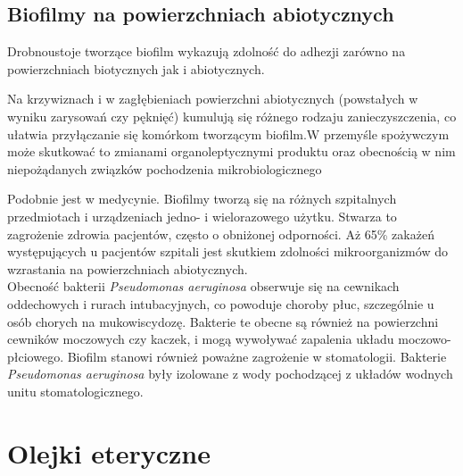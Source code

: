 \documentclass[11pt,a4paper]{report}
\begin{document}
\subsection{Biofilmy na powierzchniach abiotycznych}
Drobnoustoje tworzące biofilm wykazują zdolność do adhezji zarówno na powierzchniach biotycznych jak i abiotycznych\cite{czaczyk-myszka}.

Na krzywiznach i w zagłębieniach powierzchni abiotycznych (powstałych w wyniku zarysowań czy pęknięć) kumulują się różnego rodzaju zanieczyszczenia, co ułatwia przyłączanie się komórkom tworzącym biofilm.W przemyśle spożywczym może skutkować to zmianami organoleptycznymi produktu oraz obecnością w nim niepożądanych związków pochodzenia mikrobiologicznego\cite{usuwanie}

 
Podobnie jest w medycynie. Biofilmy tworzą się na różnych szpitalnych przedmiotach i urządzeniach jedno- i wielorazowego użytku. Stwarza to zagrożenie zdrowia pacjentów, często o obniżonej odporności.
Aż 65\% zakażeń występujących u pacjentów szpitali jest skutkiem zdolności mikroorganizmów do wzrastania na powierzchniach abiotycznych\cite{czaczyk-myszka}.\\
Obecność bakterii \textit{Pseudomonas aeruginosa} obserwuje się na cewnikach oddechowych i rurach intubacyjnych, co powoduje choroby płuc, szczególnie u osób chorych na mukowiscydozę.
\cite{mukowiscydoza}
Bakterie te obecne są również na powierzchni cewników moczowych czy kaczek, i mogą wywoływać zapalenia układu moczowo-płciowego\cite{moczowy}.
Biofilm stanowi również poważne zagrożenie w stomatologii. Bakterie \textit{Pseudomonas aeruginosa} były izolowane z wody pochodzącej z układów wodnych unitu stomatologicznego\cite{bzdega}.

\section{Olejki eteryczne}
\end{document}

